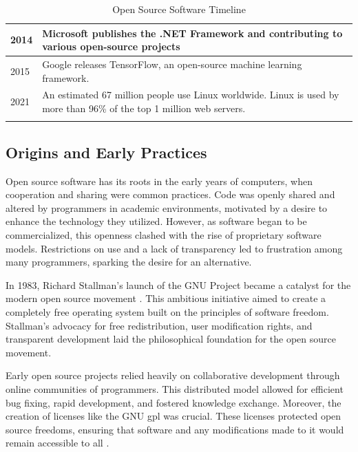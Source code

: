 \begin{center}
\begin{longtable}{|p{1cm}|p{13cm}|}
        2014          & Microsoft publishes the .NET Framework and contributing to various open-source projects                                                                                                                \\ \hline
        2015          & Google releases TensorFlow, an open-source machine learning framework.                                                                                                                                 \\ \hline
        2021          & An estimated 67 million people use Linux worldwide. Linux is used by more than 96\% of the top 1 million web servers.                                                                                  \\ \hline

        \caption{Open Source Software Timeline \cite{17alexander2002working}}
        \label{tab:oss_timeline}
    \end{longtable}
\end{center}


\subsection{Origins and Early Practices}

Open source software has its roots in the early years of computers, when cooperation and sharing were common practices. Code was openly shared and altered by programmers in academic environments, motivated by a desire to enhance the technology they utilized. However, as software began to be commercialized, this openness clashed with the rise of proprietary software models. Restrictions on use and a lack of transparency led to frustration among many programmers, sparking the desire for an alternative.

In 1983, Richard Stallman's launch of the GNU Project became a catalyst for the modern open source movement \cite{dibona1999open}.  This ambitious initiative aimed to create a completely free operating system built on the principles of software freedom.  Stallman's advocacy for free redistribution, user modification rights, and transparent development laid the philosophical foundation for the open source movement.

Early open source projects relied heavily on collaborative development through online communities of programmers. This distributed model allowed for efficient bug fixing, rapid development, and fostered knowledge exchange.  Moreover, the creation of licenses like the GNU \ac{gpl} was crucial. These licenses protected open source freedoms, ensuring that software and any modifications made to it would remain accessible to all \cite{license1989gnu}.


